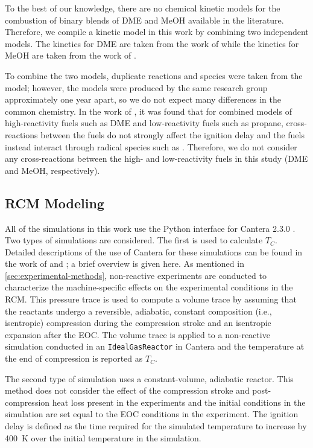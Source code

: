 \documentclass[12pt]{../ussci}
\begin{document}
To the best of our knowledge, there are no chemical kinetic models for the
combustion of binary blends of DME and MeOH available in the literature.
Therefore, we compile a kinetic model in this work by combining two independent
models. The kinetics for DME are taken from the work of \textcite{Burke2015a}
while the kinetics for MeOH are taken from the work of \textcite{Burke2016}.

To combine the two models, duplicate reactions and species were taken from the
\textcite{Burke2015a} model; however, the models were produced by the same
research group approximately one year apart, so we do not expect many
differences in the common chemistry. In the work of \textcite{Dames2016}, it was
found that for combined models of high-reactivity fuels such as DME and
low-reactivity fuels such as propane, cross-reactions between the fuels do not
strongly affect the ignition delay and the fuels instead interact through
radical species such as . Therefore, we do not consider any
cross-reactions between the high- and low-reactivity fuels in this study (DME
and MeOH, respectively).

\subsection{RCM Modeling}\label{sec:rcm-modeling}

All of the simulations in this work use the Python interface for Cantera 2.3.0
\autocite{cantera}. Two types of simulations are considered. The first is used
to calculate \(T_C\). Detailed descriptions of the use of Cantera for these
simulations can be found in the work of \textcite{Weber2016a} and
\textcite{Dames2016}; a brief overview is given here. As mentioned in
\cref{sec:experimental-methods}, non-reactive experiments are conducted to
characterize the machine-specific effects on the experimental conditions in the
RCM. This pressure trace is used to compute a volume trace by assuming that the
reactants undergo a reversible, adiabatic, constant composition (i.e.,
isentropic) compression during the compression stroke and an isentropic
expansion after the EOC. The volume trace is applied to a non-reactive
simulation conducted in an \verb|IdealGasReactor| in Cantera \autocite{cantera}
and the temperature at the end of compression is reported as \(T_C\).

The second type of simulation uses a constant-volume, adiabatic reactor. This
method does not consider the effect of the compression stroke and
post-compression heat loss present in the experiments and the initial conditions
in the simulation are set equal to the EOC conditions in the experiment. The
ignition delay is defined as the time required for the simulated temperature to
increase by \SI{400}{\K} over the initial temperature in the simulation.
\end{document}
